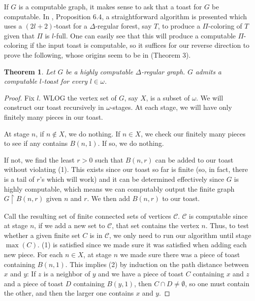 \documentclass[11pt]{amsart}
\newtheorem{theorem}{Theorem}
\theoremstyle{definition}
\newcommand{\C}{\mathcal{C}}
\newcommand{\res}{\upharpoonright}
\begin{document}
If $G$ is a computable graph, it makes sense to ask that a toast for $G$ be computable. In \cite{G+_trees}, Proposition 6.4, a straightforward algorithm is presented which uses a $(2l+2)$-toast for a $\Delta$-regular forest, say $T$, to produce a $\Pi$-coloring of $T$ given that $\Pi$ is $l$-full. One can easily see that this will produce a computable $\Pi$-coloring if the input toast is computable, so it suffices for our reverse direction to prove the following, whose origins seem to be in \cite{bean} (Theorem 3).

\begin{theorem}\label{thm:comptoast}
    Let $G$ be a highly computable $\Delta$-regular graph. $G$ admits a computable $l$-toast for every $l \in \omega$.
\end{theorem}

\begin{proof}
Fix $l$. WLOG the vertex set of $G$, say $X$, is a subset of $\omega$. We will construct our toast recursively in $\omega$-stages. At each stage, we will have only finitely many pieces in our toast.

At stage $n$, if $n \not\in X$, we do nothing. If $n \in X$, we check our finitely many pieces to see if any contains $B(n,1)$. If so, we do nothing.

If not, we find the least $r > 0$ such that $B(n,r)$ can be added to our toast without violating (1). This exists since our toast so far is finite (so, in fact, there is a tail of $r$'s which will work) and it can be determined effectively since $G$ is highly computable, which means we can computably output the finite graph $G \res B(n,r)$ given $n$ and $r$. We then add $B(n,r)$ to our toast. 

Call the resulting set of finite connected sets of vertices $\C$. $\C$ is computable since at stage $n$, if we add a new set to $\C$, that set contains the vertex $n$. Thus, to test whether a given finite set $C$ is in $\C$, we only need to run our algorithm until stage $\max(C)$. (1) is satisfied since we made sure it was satisfied when adding each new piece. For each $n \in X$, at stage $n$ we made sure there was a piece of toast containing $B(n,1)$. This implies (2) by induction on the path distance between $x$ and $y$: If $z$ is a neighbor of $y$ and we have a piece of toast $C$ containing $x$ and $z$ and a piece of toast $D$ containing $B(y,1)$, then $C \cap D \neq \emptyset$, so one must contain the other, and then the larger one contains $x$ and $y$.
\end{proof}
\end{document}
